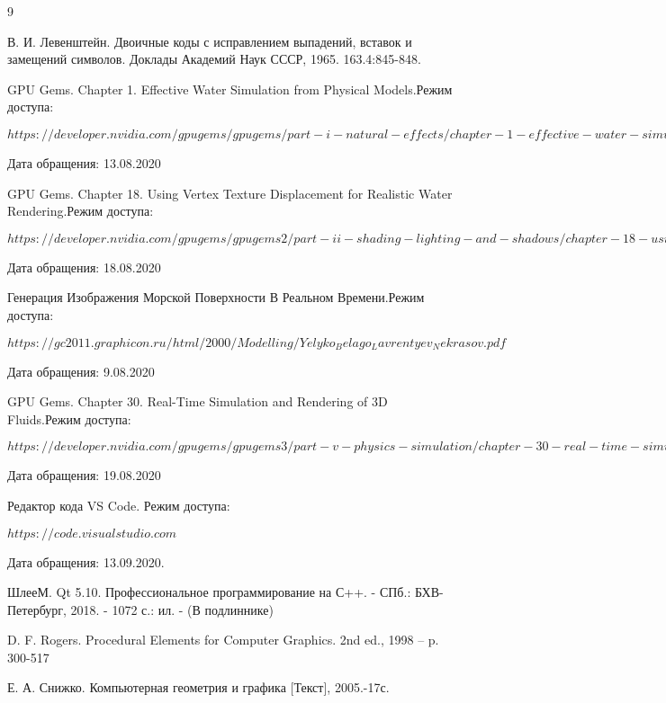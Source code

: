 \begin{thebibliography}{9}
		\bibitem{} В. И. Левенштейн. Двоичные коды с исправлением выпадений, вставок и замещений символов. Доклады Академий Наук СССР, 1965. 163.4:845-848.
		
		\bibitem{} GPU Gems. Chapter 1. Effective Water Simulation from Physical Models.Режим доступа:
 	     
 	    $https://developer.nvidia.com/gpugems/gpugems/part-i-natural-effects/chapter-1-effective-water-simulation-physical-models$
 	    
 	    Дата обращения: 13.08.2020
 	    
 	    \bibitem{} GPU Gems. Chapter 18. Using Vertex Texture Displacement for Realistic Water Rendering.Режим доступа:
 	    
 	    $https://developer.nvidia.com/gpugems/gpugems2/part-ii-shading-lighting-and-shadows/chapter-18-using-vertex-texture-displacement$
 	    
 	    Дата обращения: 18.08.2020
 	    
 	    \bibitem{} Генерация Изображения Морской Поверхности В Реальном Времени.Режим доступа:
 	    
 	    $https://gc2011.graphicon.ru/html/2000/Modelling/Yelyko_Belago_Lavrentyev_Nekrasov.pdf$
 	    
 	    Дата обращения: 9.08.2020
 	    
 	    
 	    \bibitem{} GPU Gems. Chapter 30. Real-Time Simulation and Rendering of 3D Fluids.Режим доступа:
 	    
 	    $https://developer.nvidia.com/gpugems/gpugems3/part-v-physics-simulation/chapter-30-real-time-simulation-and-rendering-3d-fluids$
 	    
 	    Дата обращения: 19.08.2020
 	    
 	    \bibitem{} Редактор кода VS Code. Режим доступа: 
 	    
 	    $https://code.visualstudio.com$ 
 	    
 	    Дата обращения: 13.09.2020.
 	    
 	    \bibitem{} ШлееМ. Qt 5.10. Профессиональное программирование на С++. - СПб.: БХВ-Петербург, 2018. - 1072 с.: ил. - (В подлиннике)
 	    
 	    \bibitem{} D. F. Rogers. Procedural Elements for Computer Graphics. 2nd ed., 1998 – p. 300-517
 	    
 	    \bibitem{} Е. А. Снижко. Компьютерная геометрия и графика [Текст], 2005.-17с.
 	    
\end{thebibliography}